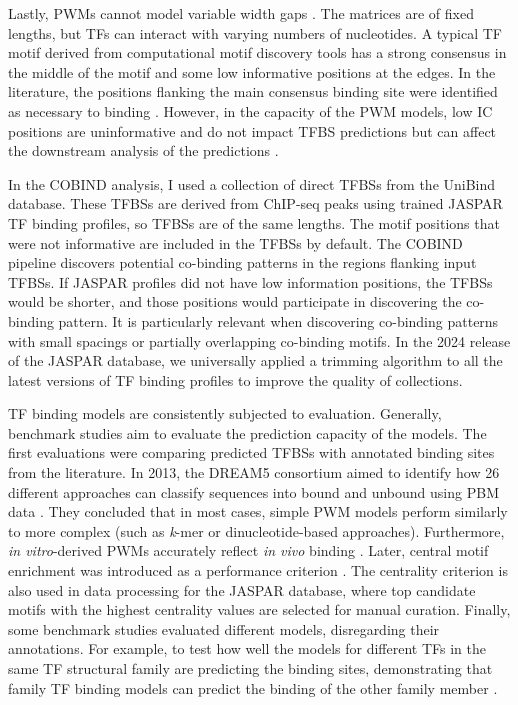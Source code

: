     Lastly, PWMs cannot model variable width gaps \cite{weirauch2013evaluation}. The matrices are of fixed lengths, but TFs can interact with varying numbers of nucleotides. A typical TF motif derived from computational motif discovery tools has a strong consensus in the middle of the motif and some low informative positions at the edges. In the literature, the positions flanking the main consensus binding site were identified as necessary to binding \cite{mathelier2016dna}. However, in the capacity of the PWM models, low IC positions are uninformative and do not impact TFBS predictions but can affect the downstream analysis of the predictions \cite{rauluseviciute2024jaspar}.

    In the COBIND analysis, I used a collection of direct TFBSs from the UniBind database. These TFBSs are derived from ChIP-seq peaks using trained JASPAR TF binding profiles, so TFBSs are of the same lengths. The motif positions that were not informative are included in the TFBSs by default. The COBIND pipeline discovers potential co-binding patterns in the regions flanking input TFBSs. If JASPAR profiles did not have low information positions, the TFBSs would be shorter, and those positions would participate in discovering the co-binding pattern. It is particularly relevant when discovering co-binding patterns with small spacings or partially overlapping co-binding motifs. In the 2024 release of the JASPAR database, we universally applied a trimming algorithm to all the latest versions of TF binding profiles to improve the quality of collections.

    TF binding models are consistently subjected to evaluation. Generally, benchmark studies aim to evaluate the prediction capacity of the models. The first evaluations were comparing predicted TFBSs with annotated binding sites from the literature. In 2013, the DREAM5 consortium aimed to identify how 26 different approaches can classify sequences into bound and unbound using PBM data \cite{weirauch2013evaluation}. They concluded that in most cases, simple PWM models perform similarly to more complex (such as \textit{k}-mer or dinucleotide-based approaches). Furthermore, \textit{in vitro}-derived PWMs accurately reflect \textit{in vivo} binding \cite{weirauch2013evaluation}. Later, central motif enrichment was introduced as a performance criterion \cite{ambrosini2020insights}. The centrality criterion is also used in data processing for the JASPAR database, where top candidate motifs with the highest centrality values are selected for manual curation. Finally, some benchmark studies evaluated different models, disregarding their annotations. For example, to test how well the models for different TFs in the same TF structural family are predicting the binding sites, demonstrating that family TF binding models can predict the binding of the other family member \cite{ambrosini2020insights}.

